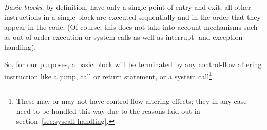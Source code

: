 \textit{Basic blocks}, by definition, have only a single point of entry and exit;
all other instructions in a single block are executed sequentially and in the order that they appear in the code.
(Of course, this does not take into account mechanisms such as out-of-order execution or system calls as well as interrupt- and exception handling).

So, for our purposes, a basic block will be terminated by any control-flow altering instruction like a jump, call or return statement, or a system call\footnote{These may or may not have control-flow altering effects; they in any case need to be handled this way due to the reasons laid out in section~\ref{sec:syscall-handling}.}.








